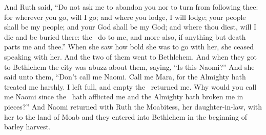\begin{inparaenum}
   And Ruth said, ``Do not ask me to abandon you nor to turn from following thee: for wherever you go, will I go; and where you lodge, I will lodge; your people shall be my people; and your God shall be my God;%
   and where thou diest, will I die and be buried there: the \lord\ do to me, and more also, if anything but death parts me and thee.''%
   When she saw how bold she was to go with her, she ceased speaking with her.%
   And the two of them went to Bethlehem. And when they got to Bethlehem the city was abuzz about them, saying, ``Is this Naomi?''%
   And she said unto them, ``Don't call me Naomi. Call me Mara, for the Almighty hath treated me harshly.%
   I left full, and empty the \lord\ returned me. Why would you call me Naomi since the \lord\ hath afflicted me and the Almighty hath broken me in pieces?''%
   And Naomi returned with Ruth the Moabitess, her daughter-in-law, with her to the land of Moab and they entered into Bethlehem in the beginning of barley harvest.%
\end{inparaenum}
